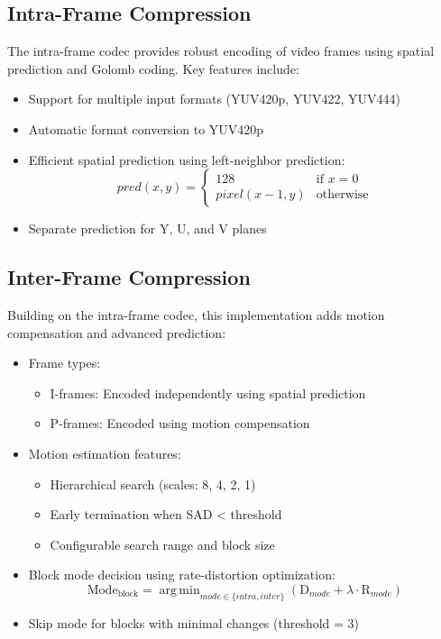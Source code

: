 \documentclass[a4paper,14pt]{article}
\DeclareMathOperator*{\argmin}{arg\,min}
\begin{document}
\subsection{Intra-Frame Compression}
The intra-frame codec provides robust encoding of video frames using spatial prediction and Golomb coding. Key features include:
\begin{itemize}
    \item Support for multiple input formats (YUV420p, YUV422, YUV444)
    \item Automatic format conversion to YUV420p
    \item Efficient spatial prediction using left-neighbor prediction:
    \begin{equation}
        pred(x,y) = \begin{cases}
            128 & \text{if } x = 0 \\
            pixel(x-1,y) & \text{otherwise}
        \end{cases}
    \end{equation}
    \item Separate prediction for Y, U, and V planes
\end{itemize}

\subsection{Inter-Frame Compression}
Building on the intra-frame codec, this implementation adds motion compensation and advanced prediction:
\begin{itemize}
    \item Frame types:
    \begin{itemize}
        \item I-frames: Encoded independently using spatial prediction
        \item P-frames: Encoded using motion compensation
    \end{itemize}
    \item Motion estimation features:
    \begin{itemize}
        \item Hierarchical search (scales: 8, 4, 2, 1)
        \item Early termination when SAD < threshold
        \item Configurable search range and block size
    \end{itemize}
    \item Block mode decision using rate-distortion optimization:
    \begin{equation}
        \text{Mode}_{\text{block}} = \argmin_{mode \in \{intra,inter\}} (\text{D}_{mode} + \lambda \cdot \text{R}_{mode})
    \end{equation}
    \item Skip mode for blocks with minimal changes (threshold = 3)
\end{itemize}
\end{document}
